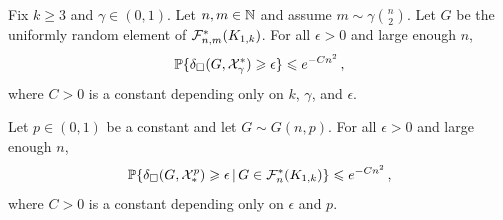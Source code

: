 \begin{lemma}\label{lemma:rough-struc-fixed-g}
Fix $k\geq3$ and $\gamma\in(0,1)$. Let $n,m\in{\mathbb N}$ and assume $m\sim\gamma\binom{n}{2}$. Let $G$ be the uniformly random element of ${\mathcal F}^\ast_{n,m}(K_{1,k})$. For all $\epsilon>0$ and large enough $n$,
$${\mathbb P}\{\delta_\square(G,{\mathcal X}^\ast_\gamma)\geqslant\epsilon\}\leqslant e^{-Cn^2}\,,$$
where $C>0$ is a constant depending only on $k$, $\gamma$, and $\epsilon$.
\end{lemma}

\begin{lemma}\label{lemma:rough-struc-gnp}
Let $p\in(0,1)$ be a constant and let $G\sim G(n,p)$. For all $\epsilon>0$ and large enough $n$,
$${\mathbb P}\{\delta_\square(G,{\mathcal X}_\ast^p)\geqslant\epsilon\,|\,G\in{\mathcal F}^\ast_n(K_{1,k})\}\leqslant e^{-Cn^2}\,,$$
where $C>0$ is a constant depending only on $\epsilon$ and $p$.
\end{lemma}
